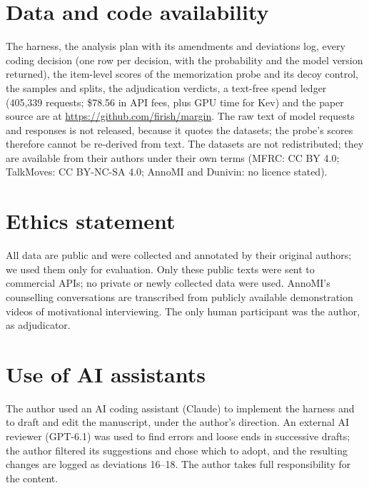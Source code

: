\section*{Data and code availability}
The harness, the analysis plan with its amendments and deviations log, every coding decision (one row per decision, with the
probability and the model version returned), the item-level scores of the memorization probe and its decoy control, the
samples and splits, the adjudication verdicts, a text-free spend ledger (405,339 requests; \$78.56 in API fees, plus GPU time
for Kev) and the paper source are at \url{https://github.com/firish/margin}. The raw text of model requests and responses is
not released, because it quotes the datasets; the probe's scores therefore cannot be re-derived from text. The datasets are
not redistributed; they are available from their authors under their own terms (MFRC: CC BY 4.0; TalkMoves: CC BY-NC-SA 4.0;
AnnoMI and Dunivin: no licence stated).

\section*{Ethics statement}
All data are public and were collected and annotated by their original authors; we used them only for evaluation. Only these
public texts were sent to commercial APIs; no private or newly collected data were used. AnnoMI's counselling conversations
are transcribed from publicly available demonstration videos of motivational interviewing. The only human participant was
the author, as adjudicator.

\section*{Use of AI assistants}
The author used an AI coding assistant (Claude) to implement the harness and to draft and edit the manuscript, under the
author's direction. An external AI reviewer (GPT-6.1) was used to find errors and loose ends in successive drafts; the author
filtered its suggestions and chose which to adopt, and the resulting changes are logged as deviations 16--18. The author takes
full responsibility for the content.
